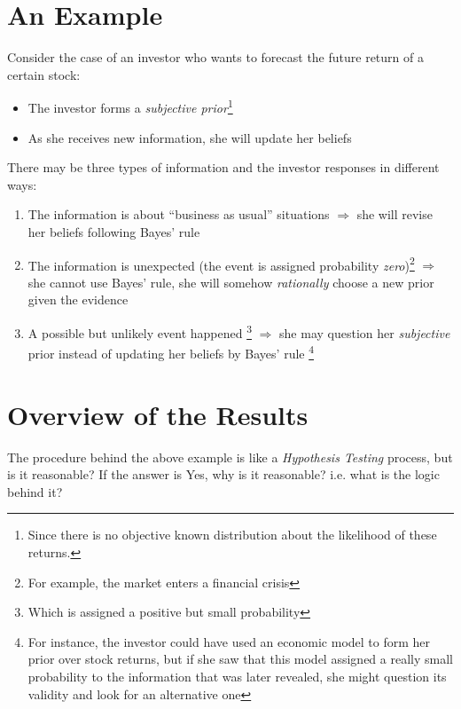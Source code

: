 \documentclass[12pt,letterpaper]{article}
\theoremstyle{definition}   %
\begin{document}
\section{An Example}

Consider the case of an investor who wants to forecast the future return of a certain stock:

\begin{itemize}
    \item The investor forms a \emph{subjective prior}\footnote{Since there is no objective known distribution about the likelihood of these returns.}
    \item As she receives new information, she will update her beliefs
\end{itemize}

There may be three types of information and the investor responses in different ways:

\begin{enumerate}
    \item The information is about “business as usual” situations $\Rightarrow$ she will revise her beliefs following Bayes' rule
    \item The information is unexpected (the event is assigned probability \emph{zero})\footnote{For example, the market enters a financial crisis} $\Rightarrow$ she cannot use Bayes' rule, she will somehow \emph{rationally} choose a new prior given the evidence
    \item A possible but unlikely event happened \footnote{Which is assigned a positive but small probability} $\Rightarrow$ she may question her \emph{subjective} prior instead of updating her beliefs by Bayes' rule \footnote{For instance, the investor could have used an economic model to form her prior over stock returns, but if she saw that this model assigned a really small probability to the information that was later revealed, she might question its validity and look for an alternative one}
\end{enumerate}



\section{Overview of the Results}

The procedure behind the above example is like a \emph{Hypothesis Testing} process, but is it reasonable? If the answer is Yes, why is it reasonable? i.e. what is the logic behind it?
\end{document}
